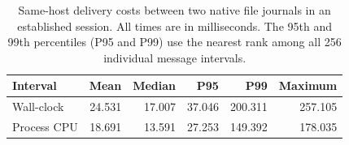 \begin{table}[t]
\centering
\small
\caption{Same-host delivery costs between two native file journals in an
established session. All times are in milliseconds. The 95th and 99th
percentiles (P95 and P99) use the nearest rank among all 256 individual
message intervals.}
\label{tab:delivery-latency}
\begin{tabularx}{\linewidth}{@{}Xrrrrr@{}}
\toprule
Interval & Mean & Median & P95 & P99 & Maximum\\
\midrule
Wall-clock & 24.531 & 17.007 & 37.046 & 200.311 & 257.105\\
Process CPU & 18.691 & 13.591 & 27.253 & 149.392 & 178.035\\
\bottomrule
\end{tabularx}
\end{table}
